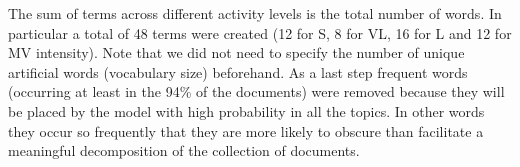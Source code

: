 The sum of terms across different activity levels is the total number of words.
In particular a total of 48 terms were created (12 for S, 8 for VL, 16 for L and 12 for MV intensity). Note that we did not need to specify the number of unique artificial words (vocabulary size) beforehand.
As a last step frequent words (occurring at least in the 94\% of the documents) were removed because they will be placed by the model with high probability in all the topics. In other words they occur so frequently that they are more likely to obscure than facilitate a meaningful decomposition of the collection of documents. 








